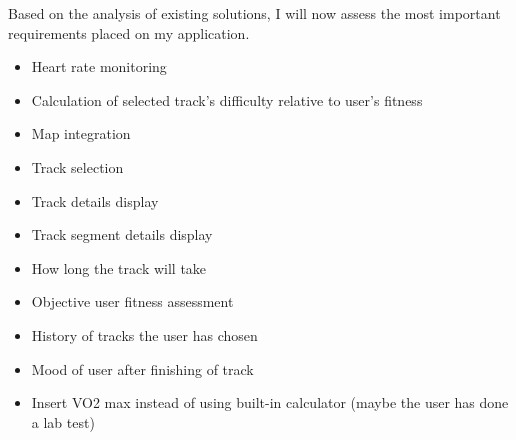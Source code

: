 \linebreak
Based on the analysis of existing solutions, I will now assess the most important requirements placed on my application.
\begin{itemize}
    \item Heart rate monitoring
    \item Calculation of selected track's difficulty relative to user's fitness
    \item Map integration
    \item Track selection
    \item Track details display
    \item Track segment details display
    \item How long the track will take 
    \item Objective user fitness assessment
    \item History of tracks the user has chosen
    \item Mood of user after finishing of track
    \item Insert VO2 max instead of using built-in calculator (maybe the user has done a lab test)
\end{itemize}
